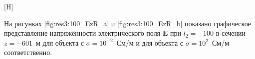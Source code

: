 \documentclass[a4paper,14pt]{article}
\makeatletter
\renewenvironment{figure}[1][\fps@figure]{
  \edef\@tempa{\noexpand\@float{figure}[#1]}
  \@tempa
  \addtocounter{foofigure}{1}
}{
  \end@float
}
\renewcommand{\Re}{\mathop{\mathrm{Re}}\nolimits}
\makeatother
\begin{document}
\begin{figure}[H]
	\centering
	\text{~~}
	\caption{векторы $(\Re(\mathbf{E}_x), \Re{\mathbf{E}_z})^T$, изолинии $\Re(\mathbf{E}_y)$ при $l_2=-100$}
	\label{fig:res3:100_vec}
\end{figure}

На рисунках \ref{fig:res3:100_EzR_a} и \ref{fig:res3:100_EzR_b} показано графическое представление напряжённости электрического поля $\mathbf{E}$ при $l_2=-100$ в сечении $z=-601$~м для объекта с $\sigma=10^{-2}$~См/м и для объекта с $\sigma=10^{2}$~См/м соответственно.
\end{document}
